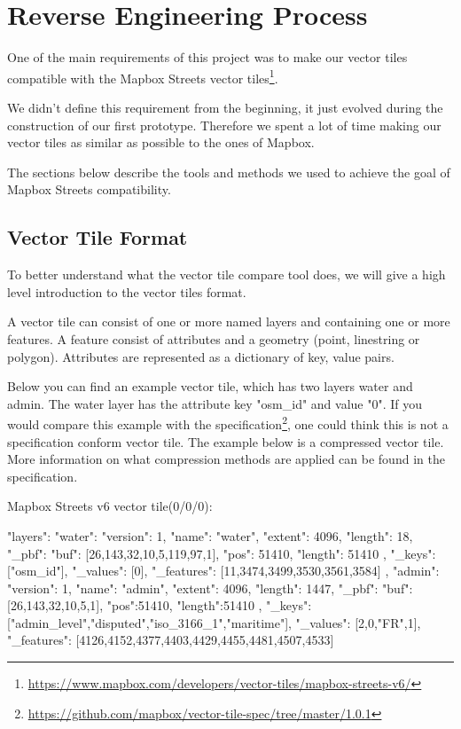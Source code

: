 \section{Reverse Engineering Process}\label{reverse_engineering_process}
One of the main requirements of this project was to make our vector tiles compatible with the Mapbox Streets vector tiles\footnote{\url{https://www.mapbox.com/developers/vector-tiles/mapbox-streets-v6/}}.

We didn't define this requirement from the beginning, it just evolved during the construction of our first prototype.
Therefore we spent a lot of time making our vector tiles as similar as possible to the ones of Mapbox.

The sections below describe the tools and methods we used to achieve the goal of Mapbox Streets compatibility.

\subsection{Vector Tile Format}\label{vector_tile_format}
To better understand what the vector tile compare tool does, we will give a high level introduction to the vector tiles format.

A vector tile can consist of one or more named layers and containing one or more features. A feature consist of attributes and a geometry (point, linestring or polygon). Attributes are represented as a dictionary of key, value pairs. 

Below you can find an example vector tile, which has two layers water and admin. The water layer has the attribute key "osm_id" and value "0". If you would compare this example with the specification\footnote{\url{https://github.com/mapbox/vector-tile-spec/tree/master/1.0.1}}, one could think this is not a specification conform vector tile. The example below is a compressed vector tile. More information on what compression methods are applied can be found in the specification. 

Mapbox Streets v6 vector tile(0/0/0):
\begin{jsoncode}
{ 
  "layers": {
    "water": {
      "version": 1,
      "name": "water",
      "extent": 4096,
      "length": 18,
      "_pbf": {
        "buf": [26,143,32,10,5,119,97,1],
        "pos": 51410,
        "length": 51410
      },
      "_keys": ["osm_id"],
      "_values": [0],
      "_features": [11,3474,3499,3530,3561,3584] 
    },
    "admin": {
      "version": 1,
      "name": "admin",
      "extent": 4096,
      "length": 1447,
      "_pbf": {
        "buf": [26,143,32,10,5,1],
        "pos":51410,
        "length":51410
       },
      "_keys": ["admin_level","disputed","iso_3166_1","maritime"],
      "_values": [2,0,"FR",1],
      "_features": [4126,4152,4377,4403,4429,4455,4481,4507,4533]
    }
  } 
}
\end{jsoncode}

